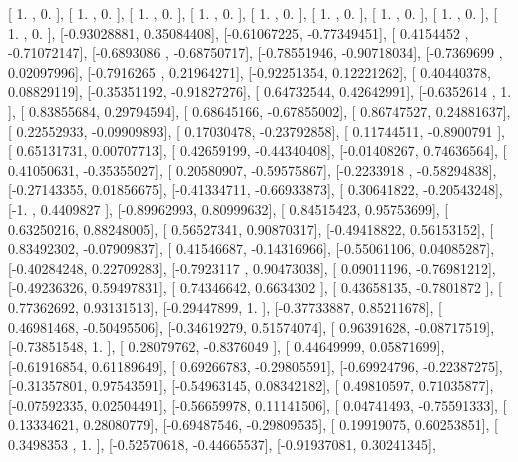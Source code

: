 \documentclass{article}
\begin{document}
       [ 1.        ,  0.        ],
       [ 1.        ,  0.        ],
       [ 1.        ,  0.        ],
       [ 1.        ,  0.        ],
       [ 1.        ,  0.        ],
       [ 1.        ,  0.        ],
       [ 1.        ,  0.        ],
       [ 1.        ,  0.        ],
       [ 1.        ,  0.        ],
       [-0.93028881,  0.35084408],
       [-0.61067225, -0.77349451],
       [ 0.4154452 , -0.71072147],
       [-0.6893086 , -0.68750717],
       [-0.78551946, -0.90718034],
       [-0.7369699 ,  0.02097996],
       [-0.7916265 ,  0.21964271],
       [-0.92251354,  0.12221262],
       [ 0.40440378,  0.08829119],
       [-0.35351192, -0.91827276],
       [ 0.64732544,  0.42642991],
       [-0.6352614 ,  1.        ],
       [ 0.83855684,  0.29794594],
       [ 0.68645166, -0.67855002],
       [ 0.86747527,  0.24881637],
       [ 0.22552933, -0.09909893],
       [ 0.17030478, -0.23792858],
       [ 0.11744511, -0.8900791 ],
       [ 0.65131731,  0.00707713],
       [ 0.42659199, -0.44340408],
       [-0.01408267,  0.74636564],
       [ 0.41050631, -0.35355027],
       [ 0.20580907, -0.59575867],
       [-0.2233918 , -0.58294838],
       [-0.27143355,  0.01856675],
       [-0.41334711, -0.66933873],
       [ 0.30641822, -0.20543248],
       [-1.        ,  0.4409827 ],
       [-0.89962993,  0.80999632],
       [ 0.84515423,  0.95753699],
       [ 0.63250216,  0.88248005],
       [ 0.56527341,  0.90870317],
       [-0.49418822,  0.56153152],
       [ 0.83492302, -0.07909837],
       [ 0.41546687, -0.14316966],
       [-0.55061106,  0.04085287],
       [-0.40284248,  0.22709283],
       [-0.7923117 ,  0.90473038],
       [ 0.09011196, -0.76981212],
       [-0.49236326,  0.59497831],
       [ 0.74346642,  0.6634302 ],
       [ 0.43658135, -0.7801872 ],
       [ 0.77362692,  0.93131513],
       [-0.29447899,  1.        ],
       [-0.37733887,  0.85211678],
       [ 0.46981468, -0.50495506],
       [-0.34619279,  0.51574074],
       [ 0.96391628, -0.08717519],
       [-0.73851548,  1.        ],
       [ 0.28079762, -0.8376049 ],
       [ 0.44649999,  0.05871699],
       [-0.61916854,  0.61189649],
       [ 0.69266783, -0.29805591],
       [-0.69924796, -0.22387275],
       [-0.31357801,  0.97543591],
       [-0.54963145,  0.08342182],
       [ 0.49810597,  0.71035877],
       [-0.07592335,  0.02504491],
       [-0.56659978,  0.11141506],
       [ 0.04741493, -0.75591333],
       [ 0.13334621,  0.28080779],
       [-0.69487546, -0.29809535],
       [ 0.19919075,  0.60253851],
       [ 0.3498353 ,  1.        ],
       [-0.52570618, -0.44665537],
       [-0.91937081,  0.30241345],
\end{document}
